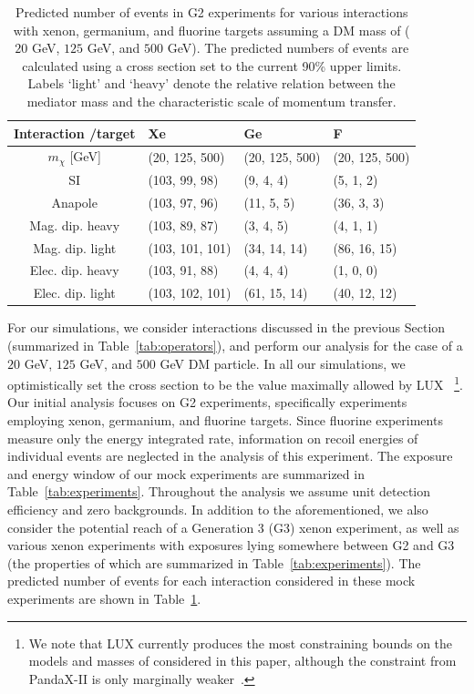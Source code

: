 \documentclass[11pt]{article}
\begin{document}
\begin{table}[t] 
\setlength{\extrarowheight}{3pt}
\setlength{\tabcolsep}{12pt}
\begin{center}
\begin{tabular}{|c||m{3cm}|m{3cm}|m{3cm}|}\hline
Interaction /target & Xe & Ge & F\\
\hline\hline 
$m_\chi$ [GeV] & (20, 125, 500) & (20, 125, 500) & (20, 125, 500) \\
\hline\hline 
SI& (103, 99, 98) & (9, 4, 4)& (5, 1, 2)\\ \hline
Anapole& (103, 97, 96)& (11, 5, 5)& (36, 3, 3)\\ \hline
Mag. dip. heavy& (103, 89, 87)& (3, 4, 5)& (4, 1, 1)\\ \hline
Mag. dip. light& (103, 101, 101)& (34, 14, 14)& (86, 16, 15)\\ \hline
Elec. dip. heavy& (103, 91, 88)& (4, 4, 4)& (1, 0, 0)\\ \hline
Elec. dip. light& (103, 102, 101)& (61, 15, 14)& (40, 12, 12)\\ \hline \hline
\end{tabular}
\end{center}
\caption{Predicted number of events in G2 experiments for various interactions with xenon, germanium, and fluorine targets assuming a DM mass of ($20$ GeV, $125$ GeV, and $500$ GeV). The predicted numbers of events are calculated using a cross section set to the current 90\% upper limits. Labels `light' and `heavy' denote the relative relation between the mediator mass and the characteristic scale of momentum transfer. }
\label{tab:pred_events}
\end{table}


For our simulations, we consider interactions discussed in the previous Section (summarized in Table~\ref{tab:operators}), and perform our analysis for the case of a $20$ GeV, $125$ GeV, and $500$ GeV DM particle. In all our simulations, we optimistically set the cross section to be the value maximally allowed by LUX~\cite{Akerib:2016vxi} \footnote{We note that LUX currently produces the most constraining bounds on the models and masses of considered in this paper, although the constraint from PandaX-II is only marginally weaker~\cite{Tan:2016zwf}.}. Our initial analysis focuses on G2 experiments, specifically experiments employing xenon, germanium, and fluorine targets. Since fluorine experiments measure only the energy integrated rate, information on recoil energies of individual events are neglected in the analysis of this experiment.  The exposure and energy window of our mock experiments are summarized in Table~\ref{tab:experiments}. Throughout the analysis we assume unit detection efficiency and zero backgrounds. In addition to the aforementioned, we also consider the potential reach of a Generation 3 (G3) xenon experiment, as well as various xenon experiments with exposures lying somewhere between G2 and G3 (the properties of which are summarized in Table~\ref{tab:experiments}).  The predicted number of events for each interaction considered in these mock experiments are shown in Table~\ref{tab:pred_events}. 
\end{document}

